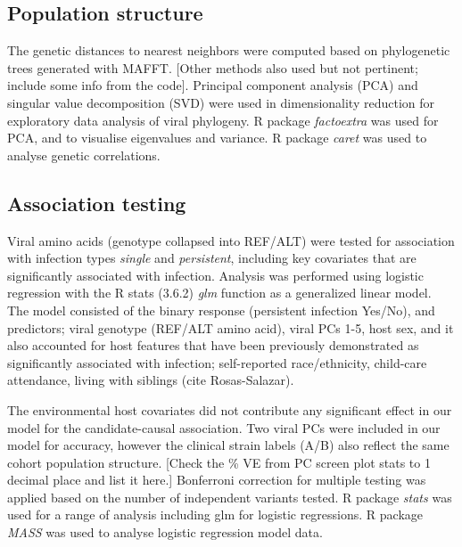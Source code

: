 \documentclass{article}
\begin{document}
\subsection{Population structure}
The genetic distances to nearest neighbors were computed based on phylogenetic 
trees generated with MAFFT.
[Other methods also used but not pertinent; include some info from the code].
Principal component analysis (PCA) and singular value decomposition (SVD) were used in dimensionality reduction for exploratory data analysis of viral phylogeny.
R package \textit{factoextra} was used for PCA, and to visualise eigenvalues and variance. 
R package \textit{caret} was used to analyse genetic correlations.

\subsection{Association testing}
Viral amino acids (genotype collapsed into REF/ALT) were tested for association with infection types \textit{single} and \textit{persistent}, 
including key covariates that are significantly associated with infection.
Analysis was performed using logistic regression with the
R stats (3.6.2) \textit{glm} function as a generalized linear model.
The model consisted of the binary response (persistent infection Yes/No), and predictors; viral genotype (REF/ALT amino acid), viral PCs 1-5, host sex, and it also accounted for host features that have been previously demonstrated as significantly associated with infection; 
self-reported race/ethnicity, child-care attendance, living with siblings (cite Rosas-Salazar).


The environmental host covariates did not contribute any significant effect in our model for the candidate-causal association.
Two viral PCs were included in our model for accuracy, however the clinical 
strain labels (A/B) also reflect the same cohort population structure.
[Check the \% VE from PC screen plot stats to 1 decimal place and list it here.]
Bonferroni correction for multiple testing was applied based on the number of independent variants tested.
R package \textit{stats} was used for a range of analysis including glm for logistic regressions. 
R package \textit{MASS} was used to analyse logistic regression model data.
\end{document}
